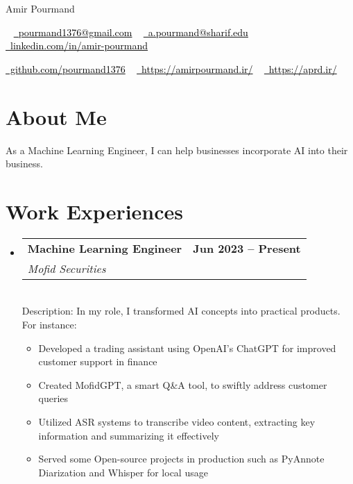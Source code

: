 \documentclass[letterpaper,11pt]{article}
\makeatletter
\newcommand{\resumeItem}[1]{
  \item\small{
    {#1 \vspace{-2pt}}
  }
}
\newcommand{\resumeSubheadingD}[5]{
  \vspace{-2pt}\item
    \begin{tabular*}{1.0\textwidth}[t]{l@{\extracolsep{\fill}}r}
      \textbf{#1} & \textbf{\small #2} \\
    \textcolor{sgray} {\textit{\small#3}} & \textcolor{sgray}{ \textit{\small #4} }\\
    \end{tabular*} %
    \\ \vspace{3pt}
    Description:{#5}
}
\newcommand{\resumeSubHeadingListStart}{\begin{itemize}[leftmargin=0.0in, label={}]}
\newcommand{\resumeSubHeadingListEnd}{\end{itemize}}
\newcommand{\resumeItemListStart}{\begin{itemize}}
\newcommand{\resumeItemListEnd}{\end{itemize}
\vspace{-5pt}
}
\makeatother
\begin{document}

\begin{center}
    {\Huge 
     Amir Pourmand} \\ \vspace{5pt}

   
  
   
    ~ 
 \href{mailto:pourmand1376@gmail.com}{ 
 	\textcolor{black}{
 	\raisebox{-0.2\height}\faEnvelope\  pourmand1376@gmail.com}}
~ 
 \href{mailto:a.pourmand@sharif.edu}
 {
 	\textcolor{black}{
 	\raisebox{-0.2\height}\faEnvelope\  a.pourmand@sharif.edu}}
\vspace{3pt}
 ~ 
    \href{https://linkedin.com/in/amir-pourmand/}
    { \textcolor{black}{
\raisebox{-0.2\height}
    \faLinkedin\ linkedin.com/in/amir-pourmand}}
    ~
    
    
    \href{https://github.com/pourmand1376}{\textcolor{black}{
    \raisebox{-0.2\height}
    \faGithub\ github.com/pourmand1376}}
    \vspace{-8pt}
    ~ 
    \href{https://amirpourmand.ir/}{
    	\textcolor{black}{
    	\raisebox{-0.2\height}\faGlobe\ https://amirpourmand.ir/}}
    ~ \href{https://aprd.ir/}{
    	\textcolor{black}{
    		\raisebox{-0.2\height}\faGlobe\ https://aprd.ir/}}
    
    \vspace{-8pt}
\end{center}

\vspace{1pt}
\section{About Me}

As a Machine Learning Engineer, I can help businesses incorporate AI into their business. 

\section{Work Experiences}
\resumeSubHeadingListStart
\resumeSubheadingD
{Machine Learning Engineer }{Jun 2023 – Present}
{Mofid Securities }{}
{ 
	In my role, I transformed AI concepts into practical products. For instance:
}
\resumeItemListStart
\resumeItem{Developed a trading assistant using OpenAI's ChatGPT for improved customer support in finance}
\resumeItem{Created MofidGPT, a smart Q\&A tool, to swiftly address customer queries}
\resumeItem{Utilized ASR systems to transcribe video content, extracting key information and summarizing it effectively}
\resumeItem{Served some Open-source projects in production such as PyAnnote Diarization and Whisper for local usage}
\resumeItemListEnd
\resumeSubHeadingListEnd
\end{document}
